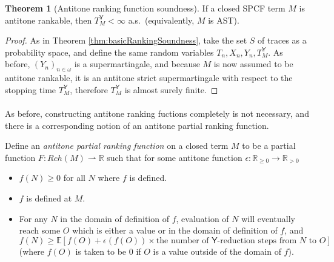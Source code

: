 \documentclass{article}
\newcommand{\tY}{\mathsf{Y}}
\theoremstyle{definition}
\theoremstyle{lemma}
\newtheorem{theorem}{Theorem}
\theoremstyle{remark}
\begin{document}
\begin{theorem}[Antitone ranking function soundness]
If a closed SPCF term $M$ is antitone rankable, then $T_M^{\tY} < \infty$ a.s.~(equivalently, $M$ is AST).
\end{theorem}
\begin{proof}
As in Theorem \ref{thm:basicRankingSoundness}, take the set $S$ of traces as a probability space, and define the same random variables $T_n, X_n, Y_n, T_M^{\tY}$. As before, $(Y_n)_{n \in \omega}$ is a supermartingale, and because $M$ is now assumed to be antitone rankable, it is an antitone strict supermartingale with respect to the stopping time $T_M^{\tY}$, therefore $T_M^{\tY}$ is almost surely finite.
\end{proof}

\paragraph{}
As before, constructing antitone ranking fuctions completely is not necessary, and there is a corresponding notion of an antitone partial ranking function.

Define an \emph{antitone partial ranking function} on a closed term $M$ to be a partial function $F : Rch(M) \rightharpoonup \mathbb{R}$ such that for some antitone function $\epsilon : \mathbb{R}_{\geq 0} \to \mathbb{R}_{>0}$
\begin{itemize}
\item $f(N) \geq 0$ for all $N$ where $f$ is defined.
\item $f$ is defined at $M$.
\item For any $N$ in the domain of definition of $f$, evaluation of $N$ will eventually reach some $O$ which is either a value or in the domain of definition of $f$, and $f(N) \geq \mathbb E [f(O) + \epsilon(f(O)) \times \text{the number of $\tY$-reduction steps from $N$ to $O$}]$ (where $f(O)$ is taken to be 0 if $O$ is a value outside of the domain of $f$).
\end{itemize}
\end{document}
